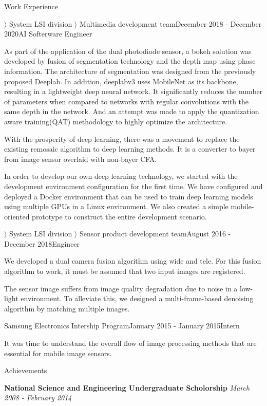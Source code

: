 \documentclass{resume}
\begin{document}
\begin{rSection}{Work Experience}
\begin{rSubsection}{$\rangle$ System LSI division $\rangle$ Multimedia development team}{December 2018 - December 2020}{AI Softerware Engineer}{}
 \item As part of the application of the dual photodiode sensor, a bokeh solution was developed by fusion of segmentation technology and the depth map using phase information. The architecture of segmentation was designed from the previously proposed Deeplab. In addition, deeplabv3 uses MobileNet as its backbone, resulting in a lightweight deep neural network. It significantly reduces the number of parameters when compared to networks with regular convolutions with the same depth in the network. And an attempt was made to apply the quantization aware training(QAT) methodology to highly optimize the architecture.
 \item With the prosperity of deep learning, there was a movement to replace the existing remosaic algorithm to deep learning methods. It is a converter to bayer from image sensor overlaid with non-bayer CFA.
  \item In order to develop our own deep learning technology, we started with the development environment configuration for the first time. We have configured and deployed a Docker environment that can be used to train deep learning models using multiple GPUs in a Linux environment. We also created a simple mobile-oriented prototype to construct the entire development scenario.
\end{rSubsection}

\begin{rSubsection}{$\rangle$ System LSI division $\rangle$ Sensor product development team}{August 2016 - December 2018}{Engineer}{}
 \item We developed a dual camera fusion algorithm using wide and tele. For this fusion algorithm to work, it must be assumed that two input images are registered.
 \item The sensor image suffers from image quality degradation due to noise in a low-light environment. To alleviate this, we designed a multi-frame-based denoising algorithm by matching multiple images.
\end{rSubsection}

\begin{rSubsection}{Samsung Electronics Intership Program}{January 2015 - January 2015}{Intern}{}
 \item It was time to understand the overall flow of image processing methods that are essential for mobile image sensors.
\end{rSubsection}

\end{rSection}
% 
\begin{rSection}{Achievements} 
 \item {\bf National Science and Engineering Undergraduate Scholorship} \hfill {\em March 2008 - February 2014} 
\end{rSection}
\end{document}
